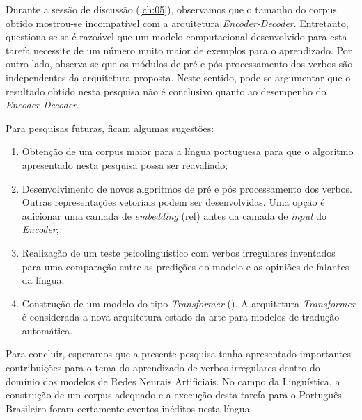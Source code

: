 Durante a sessão de discussão (\ref{ch:05}), observamos que o tamanho do corpus obtido mostrou-se incompatível com a arquitetura \textit{Encoder-Decoder}. Entretanto, questiona-se se é razoável que um modelo computacional desenvolvido para esta tarefa necessite de um número muito maior de exemplos para o aprendizado. Por outro lado, observa-se que os módulos de pré e pós processamento dos verbos são independentes da arquitetura proposta. Neste sentido, pode-se argumentar que o resultado obtido nesta pesquisa não é conclusivo quanto ao desempenho do \textit{Encoder-Decoder}. 

Para pesquisas futuras, ficam algumas sugestões:

\begin{enumerate}

\item Obtenção de um corpus maior para a língua portuguesa
para que o algoritmo apresentado nesta pesquisa possa ser reavaliado;

\item Desenvolvimento de novos algoritmos de pré e pós processamento dos verbos. Outras representações vetoriais podem ser desenvolvidas. Uma opção é adicionar uma camada de \textit{embedding} (ref) antes da camada de \textit{input} do \textit{Encoder}; 

\item Realização de um teste psicolinguístico com verbos irregulares inventados para uma comparação entre as predições do modelo e as opiniões de falantes da língua;

\item Construção de um modelo do tipo \textit{Transformer} (\cite{Vaswani2017AttentionIA}). A arquitetura \textit{Transformer} é considerada a nova arquitetura estado-da-arte para modelos de tradução automática. 

\end{enumerate}

Para concluir, esperamos que a presente pesquisa tenha apresentado importantes contribuições para o tema do aprendizado de verbos irregulares dentro do domínio dos modelos de Redes Neurais Artificiais. No campo da Linguística, a construção de um corpus adequado e a execução desta tarefa para o Português Brasileiro foram certamente eventos inéditos nesta língua. 